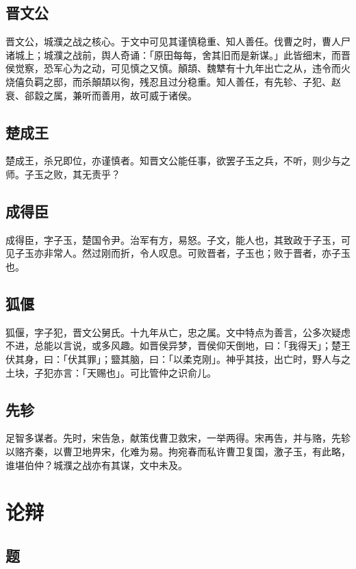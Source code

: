 \documentclass{article}
\begin{document}
\subsection{晋文公}

晋文公，城濮之战之核心。于文中可见其谨慎稳重、知人善任。伐曹之时，曹人尸诸城上；城濮之战前，舆人奇诵：「原田每每，舍其旧而是新谋。」此皆细末，而晋侯觉察，恐军心为之动，可见慎之又慎。顛頡、魏犨有十九年出亡之从，违令而火烧僖负羁之邸，而杀顛頡以徇，残忍且过分稳重。知人善任，有先轸、子犯、赵衰、郤縠之属，兼听而善用，故可威于诸侯。

\subsection{楚成王}

楚成王，杀兄即位，亦谨慎者。知晋文公能任事，欲罢子玉之兵，不听，则少与之师。子玉之败，其无责乎？

\subsection{成得臣}

成得臣，字子玉，楚国令尹。治军有方，易怒。子文，能人也，其致政于子玉，可见子玉亦非常人。然过刚而折，令人叹息。可败晋者，子玉也；败于晋者，亦子玉也。

\subsection{狐偃}

狐偃，字子犯，晋文公舅氏。十九年从亡，忠之属。文中特点为善言，公多次疑虑不进，总能以言说，或多风趣。如晋侯异梦，晋侯仰天倒地，曰：「我得天」；楚王伏其身，曰：「伏其罪」；盬其脑，曰：「以柔克刚」。神乎其技，出亡时，野人与之土块，子犯亦言：「天赐也」。可比管仲之识俞儿。

\subsection{先轸}

足智多谋者。先时，宋告急，献策伐曹卫救宋，一举两得。宋再告，并与赂，先轸以赂齐秦，以曹卫地畀宋，化难为易。拘宛春而私许曹卫复国，激子玉，有此略，谁堪伯仲？城濮之战亦有其谋，文中未及。

\section{论辩}

\subsection*{题}
\end{document}
